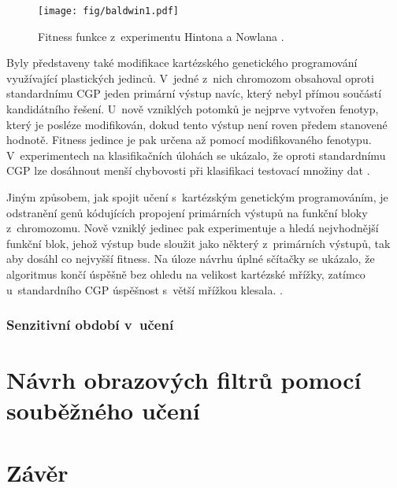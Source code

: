 \begin{figure}[htb]
    \centering\texttt{[image: fig/baldwin1.pdf]}
    \caption{Fitness funkce z~experimentu Hintona a Nowlana \cite{HintonNowlan}.}
    \label{obrHintonNowlan}
\end{figure}

Byly představeny také modifikace kartézského genetického programování využívající plastických jedinců.
V~jedné z~nich chromozom obsahoval oproti standardnímu CGP jeden primární výstup navíc, který nebyl přímou součástí kandidátního řešení. U~nově vzniklých potomků je nejprve vytvořen fenotyp, který je posléze modifikován, dokud tento výstup není roven předem stanovené hodnotě. Fitness jedince je pak určena až pomocí modifikovaného fenotypu. V~experimentech na klasifikačních úlohách se ukázalo, že oproti standardnímu CGP lze dosáhnout menší chybovosti při klasifikaci testovací množiny dat \cite{UllahPlasticCGP}.

Jiným způsobem, jak spojit učení s~kartézským genetickým programováním, je odstranění genů kódujících  propojení primárních výstupů na funkční bloky z~chromozomu. Nově vzniklý jedinec pak experimentuje a hledá nejvhodnější funkční blok, jehož výstup bude sloužit jako některý z~primárních výstupů, tak aby dosáhl co nejvyšší fitness. Na úloze návrhu úplné sčítačky se ukázalo, že algoritmus končí úspěšně bez ohledu na velikost kartézské mřížky, zatímco u~standardního CGP úspěšnost s~větší mřížkou klesala. \cite{KhatirPlasticCGP}.

\subsection{Senzitivní období v~učení}

\blind
\blind








\chapter{Návrh obrazových filtrů pomocí souběžného učení}

\Blind

\chapter{Závěr}

\blind
\blind
